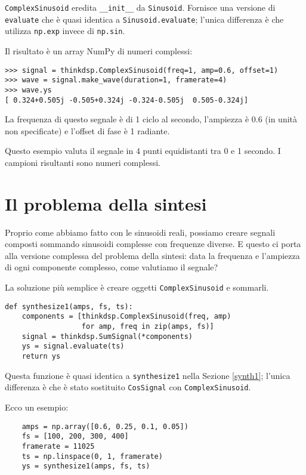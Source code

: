 \documentclass[12pt,a4paper]{book}
\begin{document}
{\tt ComplexSinusoid} eredita \verb"__init__" da {\tt Sinusoid}. Fornisce una versione di {\tt evaluate} che è quasi identica a {\tt Sinusoid.evaluate}; l'unica differenza è che utilizza {\tt np.exp} invece di {\tt np.sin}.

Il risultato è un array NumPy di numeri complessi:

\begin{verbatim} 
>>> signal = thinkdsp.ComplexSinusoid(freq=1, amp=0.6, offset=1)
>>> wave = signal.make_wave(duration=1, framerate=4)
>>> wave.ys
[ 0.324+0.505j -0.505+0.324j -0.324-0.505j  0.505-0.324j]
 \end{verbatim} 

La frequenza di questo segnale è di 1 ciclo al secondo, l'ampiezza è 0.6 (in unità non specificate) e l'offset di fase è 1 radiante.

Questo esempio valuta il segnale in 4 punti equidistanti tra 0 e 1 secondo. I campioni risultanti sono numeri complessi.

\section{Il problema della sintesi} 

Proprio come abbiamo fatto con le sinusoidi reali, possiamo creare segnali composti sommando sinusoidi complesse con frequenze diverse. E questo ci porta alla versione complessa del problema della sintesi: data la frequenza e l'ampiezza di ogni componente complesso, come valutiamo il segnale?

La soluzione più semplice è creare oggetti {\tt ComplexSinusoid} e sommarli.

\begin{verbatim} 
def synthesize1(amps, fs, ts):
    components = [thinkdsp.ComplexSinusoid(freq, amp)
                  for amp, freq in zip(amps, fs)]
    signal = thinkdsp.SumSignal(*components)
    ys = signal.evaluate(ts)
    return ys
 \end{verbatim} 

Questa funzione è quasi identica a {\tt synthesize1} nella Sezione \ref{synth1}; l'unica differenza è che è stato sostituito {\tt CosSignal} con {\tt ComplexSinusoid}.

Ecco un esempio:

\begin{verbatim} 
    amps = np.array([0.6, 0.25, 0.1, 0.05])
    fs = [100, 200, 300, 400]
    framerate = 11025
    ts = np.linspace(0, 1, framerate)
    ys = synthesize1(amps, fs, ts)
 \end{verbatim} 
\end{document}

